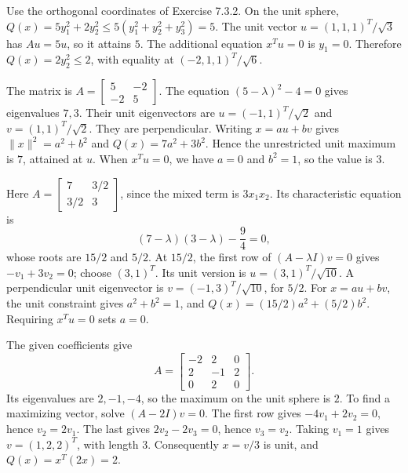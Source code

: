 Use the orthogonal coordinates of Exercise 7.3.2. On the unit sphere,
$Q(x)=5y_1^2+2y_2^2\le5(y_1^2+y_2^2+y_3^2)=5$.
The unit vector $u=(1,1,1)^T/\sqrt3$ has $Au=5u$, so it attains $5$.
The additional equation $x^Tu=0$ is $y_1=0$. Therefore
$Q(x)=2y_2^2\le2$, with equality at $(-2,1,1)^T/\sqrt6$.

The matrix is $A=\begin{bmatrix}5&-2\\-2&5\end{bmatrix}$.
The equation $(5-\lambda)^2-4=0$ gives eigenvalues $7,3$.
Their unit eigenvectors are $u=(-1,1)^T/\sqrt2$ and
$v=(1,1)^T/\sqrt2$. They are perpendicular. Writing $x=au+bv$ gives
$\|x\|^2=a^2+b^2$ and $Q(x)=7a^2+3b^2$.
Hence the unrestricted unit maximum is $7$, attained at $u$.
When $x^Tu=0$, we have $a=0$ and $b^2=1$, so the value is $3$.

Here $A=\begin{bmatrix}7&3/2\\3/2&3\end{bmatrix}$, since the mixed
term is $3x_1x_2$. Its characteristic equation is
\[
 (7-\lambda)(3-\lambda)-\frac94=0,
\]
whose roots are $15/2$ and $5/2$. At $15/2$, the first row of
$(A-\lambda I)v=0$ gives $-v_1+3v_2=0$; choose $(3,1)^T$.
Its unit version is $u=(3,1)^T/\sqrt{10}$. A perpendicular unit
eigenvector is $v=(-1,3)^T/\sqrt{10}$, for $5/2$.
For $x=au+bv$, the unit constraint gives $a^2+b^2=1$, and
$Q(x)=(15/2)a^2+(5/2)b^2$. Requiring $x^Tu=0$ sets $a=0$.

The given coefficients give
\[
 A=\begin{bmatrix}-2&2&0\\2&-1&2\\0&2&0\end{bmatrix}.
\]
Its eigenvalues are $2,-1,-4$, so the maximum on the unit sphere is $2$.
To find a maximizing vector, solve $(A-2I)v=0$. The first row gives
$-4v_1+2v_2=0$, hence $v_2=2v_1$. The last gives
$2v_2-2v_3=0$, hence $v_3=v_2$. Taking $v_1=1$ gives
$v=(1,2,2)^T$, with length $3$. Consequently $x=v/3$ is unit, and
$Q(x)=x^T(2x)=2$.

